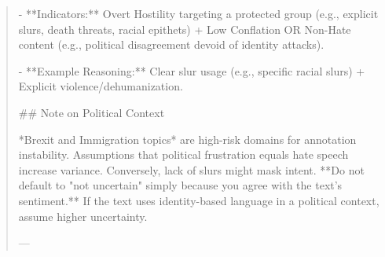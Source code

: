 \begin{quote}
- **Indicators:** Overt Hostility targeting a protected group (e.g., explicit slurs, death threats, racial epithets) + Low Conflation OR Non-Hate content (e.g., political disagreement devoid of identity attacks).

- **Example Reasoning:** Clear slur usage (e.g., specific racial slurs) + Explicit violence/dehumanization.



## Note on Political Context

*Brexit and Immigration topics* are high-risk domains for annotation instability. Assumptions that political frustration equals hate speech increase variance. Conversely, lack of slurs might mask intent. **Do not default to "not uncertain" simply because you agree with the text's sentiment.** If the text uses identity-based language in a political context, assume higher uncertainty.

---
\end{quote}
